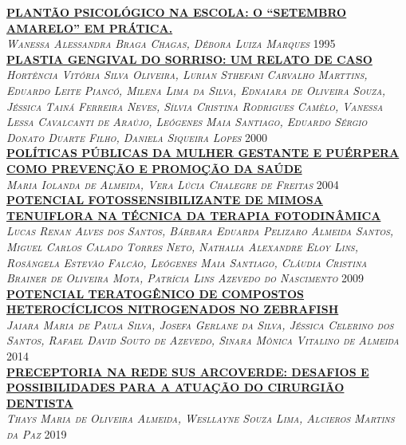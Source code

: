 \noindent \textsc{\hyperlink{trabalhos/249991.pdf.1}{\textbf{PLANTÃO PSICOLÓGICO NA ESCOLA:  O “SETEMBRO AMARELO” EM PRÁTICA.}}}\\ 
\noindent \textsc{\textit{Wanessa Alessandra Braga Chagas, Débora Luiza Marques}} \hfill 1995\\ 

\noindent \textsc{\hyperlink{trabalhos/249302.pdf.1}{\textbf{PLASTIA GENGIVAL DO SORRISO: UM RELATO DE CASO}}}\\ 
\noindent \textsc{\textit{Hortência Vitória Silva Oliveira, Lurian Sthefani Carvalho Marttins, Eduardo Leite Piancó, Milena Lima da Silva, Ednaiara de Oliveira Souza, Jéssica Tainá Ferreira Neves, Sílvia Cristina Rodrigues Camêlo, Vanessa Lessa Cavalcanti de Araújo, Leógenes Maia Santiago, Eduardo Sérgio Donato Duarte Filho, Daniela Siqueira Lopes}} \hfill 2000\\ 

\noindent \textsc{\hyperlink{trabalhos/249424.pdf.1}{\textbf{POLÍTICAS PÚBLICAS DA MULHER GESTANTE E PUÉRPERA  COMO PREVENÇÃO E PROMOÇÃO DA SAÚDE}}}\\ 
\noindent \textsc{\textit{Maria Iolanda de Almeida, Vera Lúcia Chalegre de Freitas}} \hfill 2004\\ 

\noindent \textsc{\hyperlink{trabalhos/251800.pdf.1}{\textbf{POTENCIAL FOTOSSENSIBILIZANTE DE MIMOSA TENUIFLORA NA TÉCNICA DA TERAPIA FOTODINÂMICA }}}\\ 
\noindent \textsc{\textit{Lucas Renan Alves dos Santos, Bárbara Eduarda Pelizaro Almeida Santos, Miguel Carlos Calado Torres Neto, Nathalia Alexandre Eloy Lins, Rosângela Estevão Falcão, Leógenes Maia Santiago, Cláudia Cristina Brainer de Oliveira Mota, Patrícia Lins Azevedo do Nascimento}} \hfill 2009\\ 

\noindent \textsc{\hyperlink{trabalhos/249228.pdf.1}{\textbf{POTENCIAL TERATOGÊNICO DE COMPOSTOS HETEROCÍCLICOS NITROGENADOS NO ZEBRAFISH }}}\\ 
\noindent \textsc{\textit{Jaiara Maria de Paula Silva, Josefa Gerlane da Silva, Jéssica Celerino dos Santos, Rafael David Souto de Azevedo, Sinara Mônica Vitalino de Almeida}} \hfill 2014\\ 

\noindent \textsc{\hyperlink{trabalhos/251965.pdf.1}{\textbf{PRECEPTORIA NA REDE SUS ARCOVERDE: DESAFIOS E POSSIBILIDADES PARA A ATUAÇÃO DO CIRURGIÃO DENTISTA }}}\\ 
\noindent \textsc{\textit{Thays Maria de Oliveira Almeida, Wesllayne Souza Lima, Alcieros Martins da Paz}} \hfill 2019\\ 

